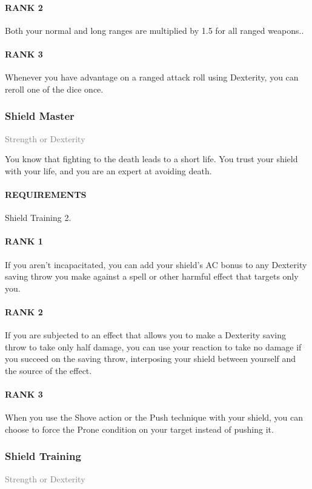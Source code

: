 \paragraph{RANK 2} Both your normal and long ranges are multiplied by 1.5 for all ranged weapons..
\paragraph{RANK 3} Whenever you have advantage on a ranged attack roll using Dexterity, you can reroll one of the dice once.

\subsubsection{Shield Master} \label{feat::shieldmaster}
\small{\textcolor{gray}{Strength or Dexterity}}

\normalsize
You know that fighting to the death leads to a short life.
You trust your shield with your life, and you are an expert at avoiding death.
\paragraph{REQUIREMENTS} Shield Training 2.
\paragraph{RANK 1} If you aren't incapacitated, you can add your shield's AC bonus to any Dexterity saving throw you make against a spell or other harmful effect that targets only you.
\paragraph{RANK 2} If you are subjected to an effect that allows you to make a Dexterity saving throw to take only half damage, you can use your reaction to take no damage if you succeed on the saving throw, interposing your shield between yourself and the source of the effect.
\paragraph{RANK 3} When you use the Shove action or the Push technique with your shield, you can choose to force the Prone condition on your target instead of pushing it.

\subsubsection{Shield Training} \label{feat::shieldtraining}
\small{\textcolor{gray}{Strength or Dexterity}}

